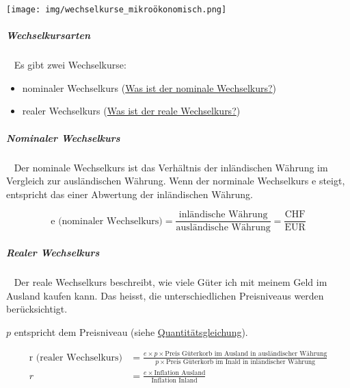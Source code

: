 \documentclass[11pt,twoside,landscape]{article}
\begin{document}
\begin{multicols}{3}
{
\begin{center}
\texttt{[image: img/wechselkurse\_mikroökonomisch.png]}
\end{center}
\label{fig:wechselkurse-als-mikroökonomisches-modell}
}

\subparagraph{Wechselkursarten} \
\label{sec:org309f119}
Es gibt zwei Wechselkurse:
\begin{itemize}
\item nominaler Wechselkurs (\href{../../../roam/20220615143018-was_ist_der_nominale_wechselkurs.org}{Was ist der nominale Wechselkurs?})
\item realer Wechselkurs (\href{../../../roam/20220615150048-was_ist_der_reale_wechselkurs.org}{Was ist der reale Wechselkurs?})
\end{itemize}

\subparagraph{Nominaler Wechselkurs} \
\label{sec:org0a14fb3}
Der nominale Wechselkurs ist das Verhältnis der inländischen Währung im Vergleich zur ausländischen Währung.
Wenn der norminale Wechselkurs e steigt, entspricht das einer Abwertung der inländischen Währung.

\begin{equation}
  \label{eqn:nominaler-wechselkurs}
  \text{e (nominaler Wechselkurs)} = \frac{\text{inländische Währung}}{\text{ausländische Währung}} = \frac{\text{CHF}}{\text{EUR}}
\end{equation}

\subparagraph{Realer Wechselkurs} \
\label{sec:org0ecf719}
Der reale Wechselkurs beschreibt, wie viele Güter ich mit meinem Geld im Ausland kaufen kann.
Das heisst, die unterschiedlichen Preisniveaus werden berücksichtigt.

\(p\) entspricht dem Preisniveau (siehe \href{../../../roam/20220614170056-wie_sieht_der_theoretische_zusammenhang_zwischen_der_geldpolitik_der_zentralbank_und_der_inflation_aus.org}{Quantitätsgleichung}).

\begin{equation}
  \label{eqn:realer-wechselkurs}
  \begin{align}
  \text{r (realer Wechselkurs)} &= \frac{e \times p \times \text{Preis Güterkorb im Ausland in ausländischer Währung}}{p \times \text{Preis Güterkorb im Inald in inländischer Währung}} \\
    r &= \frac{e \times \text{Inflation Ausland}}{\text{Inflation Inland}}
  \end{align}

\end{equation}


\end{multicols}
\end{document}
